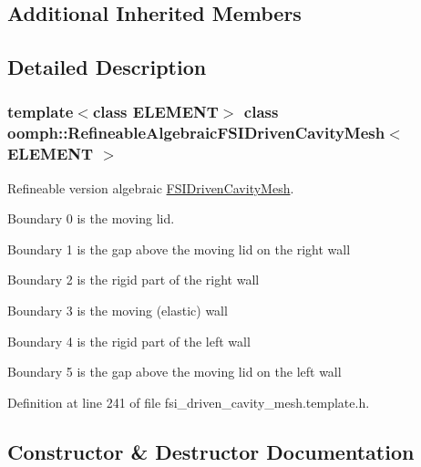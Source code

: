 \subsection*{Additional Inherited Members}


\subsection{Detailed Description}
\subsubsection*{template$<$class E\+L\+E\+M\+E\+NT$>$\newline
class oomph\+::\+Refineable\+Algebraic\+F\+S\+I\+Driven\+Cavity\+Mesh$<$ E\+L\+E\+M\+E\+N\+T $>$}

Refineable version algebraic \hyperlink{classoomph_1_1FSIDrivenCavityMesh}{F\+S\+I\+Driven\+Cavity\+Mesh}.
\begin{DoxyItemize}
\item Boundary 0 is the moving lid.
\item Boundary 1 is the gap above the moving lid on the right wall
\item Boundary 2 is the rigid part of the right wall
\item Boundary 3 is the moving (elastic) wall
\item Boundary 4 is the rigid part of the left wall
\item Boundary 5 is the gap above the moving lid on the left wall 
\end{DoxyItemize}

Definition at line 241 of file fsi\+\_\+driven\+\_\+cavity\+\_\+mesh.\+template.\+h.



\subsection{Constructor \& Destructor Documentation}
\mbox{\label{classoomph_1_1RefineableAlgebraicFSIDrivenCavityMesh_a123b12382b582eb20dd2749d9f85cd8c}} 
